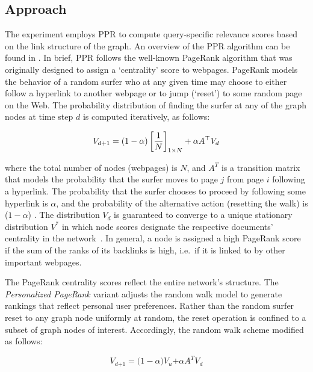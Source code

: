 \documentclass[10pt,letterpaper]{article}
\begin{document}
\subsection*{Approach}

The experiment employs PPR\cite{page1999pagerank} to compute query-specific relevance scores based on the link structure of the graph. An overview of the PPR algorithm can be found in \cite{jeh2003scaling}. In brief, PPR follows the well-known PageRank algorithm that was originally designed to assign a `centrality' score to webpages. PageRank models the behavior of a random surfer who at any given time may choose to either follow a hyperlink to another webpage or to jump (`reset') to some random page on the Web. The probability distribution of finding the surfer at any of the graph nodes at time step $d$ is computed iteratively, as follows: 

\begin{equation} \label{GrindEQ__1_} 
V_{d+1} = (1-\alpha) \left[{1 \over N}\right]_{1 \times N} + \alpha A^\top V_d 
\end{equation} 

\noindent where the total number of nodes (webpages) is $N$, and $A^T$ is a transition matrix that models the probability that the surfer moves to page $j$ from page $i$ following a hyperlink. The probability that the surfer chooses to proceed by following some hyperlink is $\alpha $, and the probability of the alternative action (resetting the walk) is ($\mathrm{1-}\alpha $) . The distribution $V_d$ is guaranteed to converge to a unique stationary distribution $V^{\mathrm{*}}$ in which node scores designate the respective documents' centrality in the network~\cite{page1999pagerank}. In general, a node is assigned a high PageRank score if the sum of the ranks of its backlinks is high, i.e.~if it is linked to by other important webpages.

The PageRank centrality scores reflect the entire network's structure. The\textit{ Personalized PageRank} variant adjusts the random walk model to generate rankings that reflect personal user preferences. Rather than the random surfer reset to any graph node uniformly at random, the reset operation is confined to a subset of graph nodes of interest. Accordingly, the random walk scheme modified as follows: 

\begin{equation} \label{GrindEQ__3_} 
V_{d\mathrm{+1}}\mathrm{=(1-}\alpha \mathrm{)}V_u\mathrm{+}\alpha A^TV_d 
\end{equation} 
\end{document}
